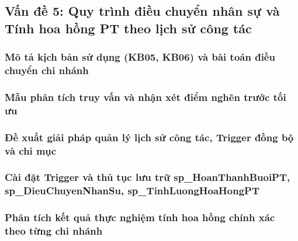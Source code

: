 \subsection{Vấn đề 5: Quy trình điều chuyển nhân sự và Tính hoa hồng PT theo lịch sử công tác}

\subsubsection{Mô tả kịch bản sử dụng (KB05, KB06) và bài toán điều chuyển chi nhánh}

\subsubsection{Mẫu phân tích truy vấn và nhận xét điểm nghẽn trước tối ưu}

\subsubsection{Đề xuất giải pháp quản lý lịch sử công tác, Trigger đồng bộ và chỉ mục}

\subsubsection{Cài đặt Trigger và thủ tục lưu trữ sp\_HoanThanhBuoiPT, sp\_DieuChuyenNhanSu, sp\_TinhLuongHoaHongPT}

\subsubsection{Phân tích kết quả thực nghiệm tính hoa hồng chính xác theo từng chi nhánh}
